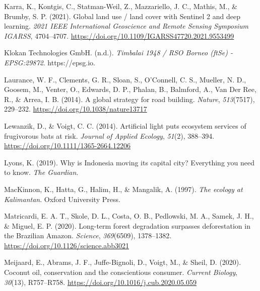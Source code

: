 \documentclass[
  letterpaper,
  DIV=11,
  numbers=noendperiod]{scrreprt}
\newlength{\cslhangindent}
\newlength{\cslentryspacingunit} %
\newenvironment{CSLReferences}[2] %
 {%
  \setlength{\parindent}{0pt}
  \ifodd #1
  \let\oldpar\par
  \def\par{\hangindent=\cslhangindent\oldpar}
  \fi
  \setlength{\parskip}{#2\cslentryspacingunit}
 }%
 {}
\begin{document}
\begin{CSLReferences}{1}{0}
\leavevmode{}%
Karra, K., Kontgis, C., Statman-Weil, Z., Mazzariello, J. C., Mathis,
M., \& Brumby, S. P. (2021). Global land use / land cover with
{Sentinel} 2 and deep learning. \emph{2021 {IEEE International
Geoscience} and {Remote Sensing Symposium IGARSS}}, 4704--4707.
\url{https://doi.org/10.1109/IGARSS47720.2021.9553499}

\leavevmode{}%
Klokan Technologies GmbH. (n.d.). \emph{Timbalai 1948 / {RSO Borneo}
({ftSe}) - {EPSG}:29872}. https://epsg.io.

\leavevmode{}%
Laurance, W. F., Clements, G. R., Sloan, S., O'Connell, C. S., Mueller,
N. D., Goosem, M., Venter, O., Edwards, D. P., Phalan, B., Balmford, A.,
Van Der Ree, R., \& Arrea, I. B. (2014). A global strategy for road
building. \emph{Nature}, \emph{513}(7517), 229--232.
\url{https://doi.org/10.1038/nature13717}

\leavevmode{}%
Lewanzik, D., \& Voigt, C. C. (2014). Artificial light puts ecosystem
services of frugivorous bats at risk. \emph{Journal of Applied Ecology},
\emph{51}(2), 388--394. \url{https://doi.org/10.1111/1365-2664.12206}

\leavevmode{}%
Lyons, K. (2019). Why is {Indonesia} moving its capital city?
{Everything} you need to know. \emph{The Guardian}.

\leavevmode{}%
MacKinnon, K., Hatta, G., Halim, H., \& Mangalik, A. (1997). \emph{The
ecology at {Kalimantan}}. {Oxford University Press}.

\leavevmode{}%
Matricardi, E. A. T., Skole, D. L., Costa, O. B., Pedlowski, M. A.,
Samek, J. H., \& Miguel, E. P. (2020). Long-term forest degradation
surpasses deforestation in the {Brazilian Amazon}. \emph{Science},
\emph{369}(6509), 1378--1382.
\url{https://doi.org/10.1126/science.abb3021}

\leavevmode{}%
Meijaard, E., Abrams, J. F., Juffe-Bignoli, D., Voigt, M., \& Sheil, D.
(2020). Coconut oil, conservation and the conscientious consumer.
\emph{Current Biology}, \emph{30}(13), R757--R758.
\url{https://doi.org/10.1016/j.cub.2020.05.059}


\end{CSLReferences}
\end{document}
